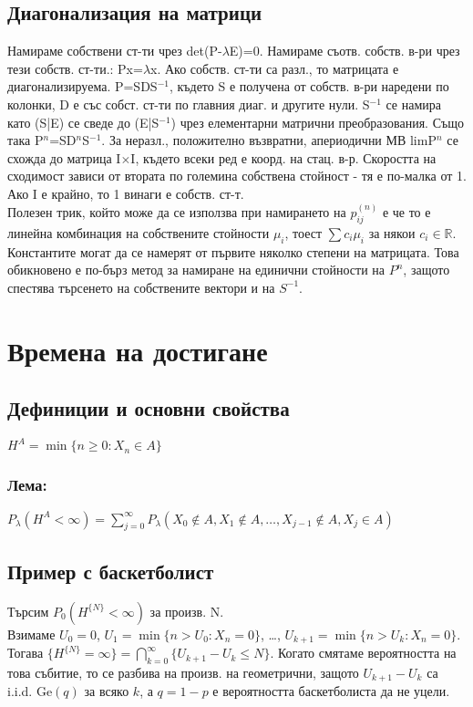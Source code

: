 \documentclass{article}
\begin{document}
\subsection{Диагонализация на матрици}
Намираме собствени ст-ти чрез det(P-$\lambda$E)=0. Намираме съотв. собств. в-ри чрез тези собств. ст-ти.: Px=$\lambda$x.
Ако собств. ст-ти са разл., то матрицата е диагонализируема.
P=SDS$^{-1}$, където S е получена от собств. в-ри наредени по колонки, D е със собст. ст-ти по главния диаг. и другите нули. 
S$^{-1}$ се намира като (S|E) се сведе до (E|S$^{-1}$) чрез елементарни матрични преобразования. 
Също така P$^n$=SD$^n$S$^{-1}$. За неразл., положително възвратни, апериодични МВ limP$^n$ се схожда до матрица I$\times$I, където всеки ред е коорд. на стац. в-р. 
Скоростта на сходимост зависи от втората по големина собствена стойност - тя е по-малка от 1. 
Ако I е крайно, то 1 винаги е собств. ст-т. \\
Полезен трик, който може да се използва при намирането на $p_{ij}^{(n)}$ е че то е линейна комбинация на собствените стойности $\mu_i$, тоест $\sum c_i\mu_i$ за някои $c_i\in \mathbb{R}$. Константите могат да се намерят от първите няколко степени на матрицата. Това обикновено е по-бърз метод за намиране на единични стойности на $P^n$, защото спестява търсенето на собствените вектори и на $S^{-1}$.

\section{Времена на достигане}
\subsection{Дефиниции и основни свойства}
$H^A = \min\{n \geq 0 : X_n \in A\}$

\subsubsection*{Лема:}
$P_\lambda(H^A < \infty) = \sum_{j=0}^\infty P_\lambda(X_0 \notin A, X_1 \notin A, \dots, X_{j-1} \notin A, X_j \in A)$

\subsection{Пример с баскетболист}
Търсим $P_0(H^{\{N\}} < \infty)$ за произв. N. \\
Взимаме $U_0 = 0$, $U_1 = \min\{n > U_0 : X_n = 0\}$, \dots, $U_{k+1} = \min\{n > U_k : X_n = 0\}$. 
Тогава $\{H^{\{N\}} = \infty\} = \bigcap_{k=0}^\infty \{U_{k+1} - U_k \leq N\}$. 
Когато смятаме вероятността на това събитие, то се разбива на произв. на геометрични, защото 
$U_{k+1} - U_k$ са i.i.d. $\mathrm{Ge}(q)$ за всяко $k$, а $q = 1 - p$ е вероятността баскетболиста да не уцели.
\end{document}
